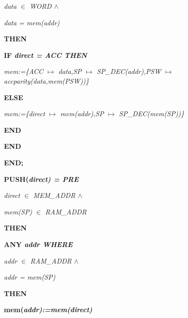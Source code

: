 \begin{sloppypar}
\hspace*{0.30in}\it data $\in$  \it WORD  $\land$ 

\hspace*{0.30in}\it data \rm = \it mem\rm (\it addr\rm )

\hspace*{0.20in}\bf THEN

\hspace*{0.30in}\bf IF \it direct \rm = \it ACC \bf THEN

\hspace*{0.40in}\it mem\rm :=\rm \{\it ACC $\mapsto$ \it data\rm ,\it SP $\mapsto$ \it SP\_DEC\rm (\it addr\rm )\rm ,\it PSW $\mapsto$ \it accparity\rm (\it data\rm ,\it mem\rm (\it PSW\rm )\rm )\rm \}

\hspace*{0.30in}\bf ELSE

\hspace*{0.40in}\it mem\rm :=\rm \{\it direct $\mapsto$ \it mem\rm (\it addr\rm )\rm ,\it SP $\mapsto$ \it SP\_DEC\rm (\it mem\rm (\it SP\rm )\rm )\rm \}

\hspace*{0.30in}\bf END

\hspace*{0.20in}\bf END

\hspace*{0.10in}\bf END\rm ;

\hspace*{0.10in}\bf PUSH\rm (\it direct\rm ) \rm = \bf PRE

\hspace*{0.20in}\it direct $\in$  \it MEM\_ADDR  $\land$ 

\hspace*{0.20in}\it mem\rm (\it SP\rm ) $\in$  \it RAM\_ADDR

\hspace*{0.10in}\bf THEN

\hspace*{0.20in}\bf ANY \it addr \bf WHERE

\hspace*{0.30in}\it addr $\in$  \it RAM\_ADDR  $\land$ 

\hspace*{0.30in}\it addr \rm = \it mem\rm (\it SP\rm )

\hspace*{0.20in}\bf THEN

\hspace*{0.30in}\bf mem\rm (\it addr\rm )\rm :=\it mem\rm (\it direct\rm )


\end{sloppypar}
